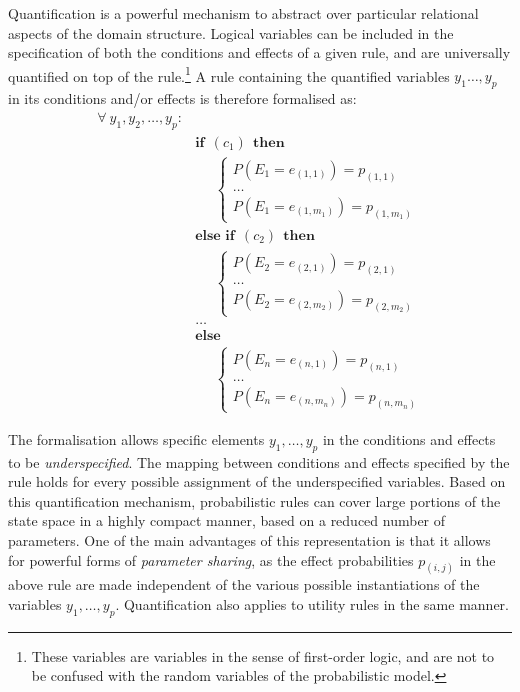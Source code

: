 Quantification is a powerful mechanism to abstract over particular relational aspects of the domain structure.  Logical variables can be included in the specification of both the conditions and effects of a given rule, and are universally quantified on top of the rule.\footnote{These variables are variables in the sense of first-order logic, and are not to be confused with the random variables of the probabilistic model.}  A rule containing the quantified variables $y_1 \dots, y_p$ in its conditions and/or effects is therefore formalised as:
\begin{equation}
\begin{aligned}
\forall \ y_1, y_2, \dots, y_p: \\
& \textbf{if} \ \ (c_{1}) \ \ \textbf{then} \\ 
& \;\;\;\;\; \begin{cases}
P(E_1\!=\!e_{(1,1)}) = p_{(1,1)} \\
 \dots \\
P(E_1\!=\!e_{(1,m_1)}) = p_{(1,m_1)} 
\end{cases} \\[3mm]
& \textbf{else if} \ \ (c_{2}) \ \ \textbf{then} \\ 
& \;\;\;\;\; \begin{cases}
P(E_2\!=\!e_{(2,1)}) = p_{(2,1)} \\
 \dots \\
P(E_2\!=\!e_{(2,m_2)}) = p_{(2,m_2)} 
\end{cases} \\ 
&  \dots  \\
& \textbf{else} \\
& \;\;\;\;\; \begin{cases}
P(E_n\!=\!e_{(n,1)}) = p_{(n,1)} \\
 \dots \\
P(E_n\!=\!e_{(n,m_n)}) = p_{(n,m_n)}
\end{cases}
\end{aligned}
\label{eq:rulewithquant}
\end{equation}

The formalisation allows specific elements $y_1, \dots, y_p$ in the conditions and effects to be \textit{underspecified}.  The mapping between conditions and effects specified by the rule holds for every possible assignment of the underspecified variables. Based on this quantification mechanism, probabilistic rules can cover large portions of the state space in a highly compact manner, based on a reduced number of parameters. One of the main advantages of this representation is that it allows for powerful forms of \textit{parameter sharing}, as the effect probabilities $p_{(i,j)}$ in the above rule are made independent of the various possible instantiations of the variables $y_1, \dots, y_p$. Quantification also applies to utility rules in the same manner. 

